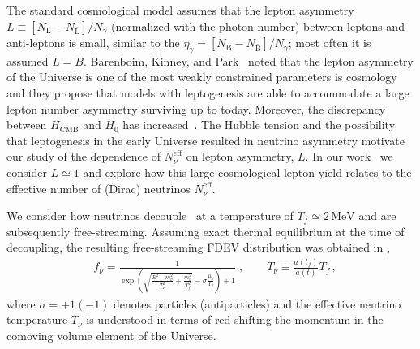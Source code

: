 The standard cosmological model assumes that the lepton asymmetry $L\equiv [N_\mathrm{L}-N_{\overline{\mathrm{L}}}] /N_\gamma $ (normalized with the photon number) 
between leptons and anti-leptons is small, similar to the  $\eta_\gamma=[N_\mathrm{B}-N_{\overline{\mathrm{B}}}]/N_\gamma $; most often it is assumed $L=B$. Barenboim, Kinney, and Park~\cite{Barenboim:2016shh,Barenboim:2017dfq} noted that the lepton asymmetry of the Universe is one of the most weakly constrained parameters is cosmology and they propose that models with leptogenesis are able to accommodate a large lepton number asymmetry surviving up to today. Moreover, the discrepancy between $H_\mathrm{CMB}$ and $H_0$ has increased~\cite{riess2018new,Riess:2018byc,Planck:2018vyg}. The Hubble tension and the possibility that leptogenesis in the early Universe resulted in neutrino asymmetry motivate our study of the dependence of $N_\nu^{\mathrm{eff}}$ on lepton asymmetry, $L$. In our work~\cite{Yang:2018oqg} we consider $L\simeq 1$ and explore how this large cosmological lepton yield relates to the effective number of (Dirac) neutrinos $N^{\mathrm{eff}}_\nu$. 

 We consider how neutrinos decouple~\cite{Birrell:2014gea} at a temperature of $T_f\simeq 2\,\mathrm{MeV}$ and are subsequently free-streaming. Assuming exact thermal equilibrium at the time of decoupling, the resulting free-streaming FDEV distribution was obtained in ,  
\begin{align}
\label{fnudef}
&f_\nu=\frac{1}{\exp{\left(\sqrt{\frac{E^2-m_\nu^2}{T_\nu^2}+\frac{m^2_\nu}{T^2_f}}-\sigma\frac{\mu_\nu}{T_f}\right)+1}}\;,\qquad T_\nu\equiv\frac{a(t_f)}{a(t)}T_f\,,
\end{align}
where $\sigma=+1(-1)$ denotes particles (antiparticles) and the effective neutrino temperature $T_\nu$ is understood in terms of red-shifting the momentum in the comoving volume element of the Universe.

